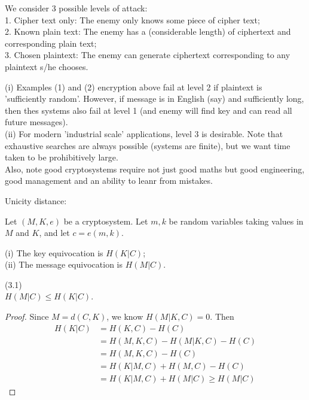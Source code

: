 \documentclass[a4paper]{article}
\begin{document}
We consider 3 possible levels of attack:\\
1. Cipher text only: The enemy only knows some piece of cipher text;\\
2. Known plain text: The enemy has a (considerable length) of ciphertext and corresponding plain text;\\
3. Chosen plaintext: The enemy can generate ciphertext corresponding to any plaintext s/he chooses.

\begin{rem}
(i) Examples (1) and (2) encryption above fail at level 2 if plaintext is 'sufficiently random'. However, if message is in English (say) and sufficiently long, then thes systems also fail at level 1 (and enemy will find key and can read all future messages).\\
(ii) For modern 'industrial scale' applications, level 3 is desirable. Note that exhaustive searches are always possible (systems are finite), but we want time taken to be prohibitively large.\\
Also, note good cryptosystems require not just good maths but good engineering, good management and an ability to leanr from mistakes.
\end{rem}

Unicity distance:

Let $(M,K,e)$ be a cryptosystem. Let $m,k$ be random variables taking values in $M$ and $K$, and let $c =e(m,k)$.
\begin{defi}
(i) The key equivocation is $H(K|C)$;\\
(ii) The message equivocation is $H(M|C)$.
\end{defi}

\begin{lemma} (3.1)\\
$H(M|C) \leq H(K|C)$.
\begin{proof}
Since $M=d(C,K)$, we know $H(M|K,C) = 0$. Then 
\begin{equation*}
\begin{aligned}
H(K|C) &= H(K,C) - H(C)\\
&= H(M,K,C) - H(M|K,C)-H(C)\\
&= H(M,K,C)-H(C)\\
&= H(K|M,C) + H(M,C) - H(C)\\
&= H(K|M,C) + H(M|C) \geq H(M|C)
\end{aligned}
\end{equation*}
\end{proof}
\end{lemma}
\end{document}
